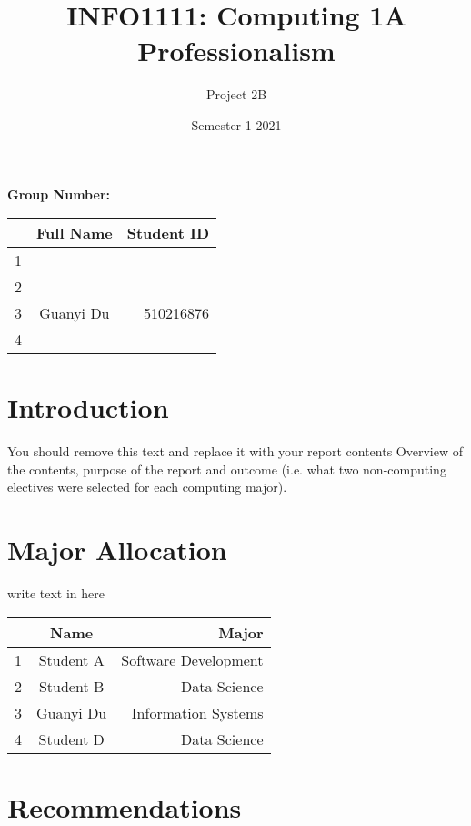 \documentclass[12pt]{article}
\title{INFO1111: Computing 1A Professionalism}
\date{Semester 1 2021}
\author{Project 2B}
\begin{document}
\maketitle

\begin{center}
    \textbf{Group Number:}
\end{center}

\begin{center}
\begin{tabular}{|l|c|r|}
\hline
  & Full Name & Student ID \\ \hline
1 &           &            \\ \hline
2 &           &            \\ \hline
3 & Guanyi Du & 510216876  \\ \hline
4 &           &            \\ \hline
\end{tabular}
\end{center}
\thispagestyle{empty}
\newpage

\setcounter{page}{1}
\section{Introduction}
You should remove this text and replace it with your report contents
Overview of the contents, purpose of the report and outcome (i.e. what two non-computing electives were selected for each computing major).


\section{Major Allocation}
write text in here
\begin{center}
\begin{tabular}{|l|c|r|}
\hline
  & Name      & Major                \\ \hline
1 & Student A & Software Development \\ \hline
2 & Student B & Data Science        \\ \hline
3 & Guanyi Du & Information Systems  \\ \hline
4 & Student D & Data Science         \\ \hline
\end{tabular}
\end{center}

\section{Recommendations}
\end{document}
